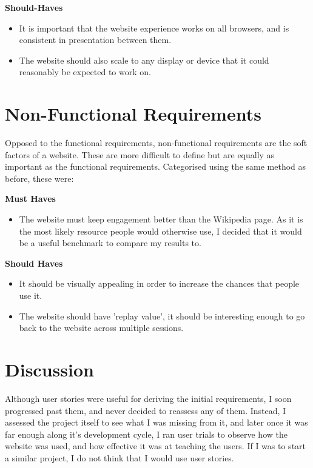 \documentclass{l4proj}
\begin{document}
\textbf{Should-Haves}

\begin{itemize}
    \item It is important that the website experience works on all browsers, and is consistent in presentation between them.
    
    \item The website should also scale to any display or device that it could reasonably be expected to work on.
\end{itemize}

\section{Non-Functional Requirements}

Opposed to the functional requirements, non-functional requirements are the soft factors of a website.  These are more difficult to define but are equally as important as the functional requirements.  Categorised using the same method as before, these were:

\textbf{Must Haves}

\begin{itemize}
    \item The website must keep engagement better than the Wikipedia page.  As it is the most likely resource people would otherwise use, I decided that it would be a useful benchmark to compare my results to.
\end{itemize}


\textbf{Should Haves}

\begin{itemize}
    \item It should be visually appealing in order to increase the chances that people use it.
    \item The website should have 'replay value', it should be interesting enough to go back to the website across multiple sessions.
\end{itemize}

\section{Discussion}

Although user stories were useful for deriving the initial requirements, I soon progressed past them, and never decided to reassess any of them.  Instead, I assessed the project itself to see what I was missing from it, and later once it was far enough along it's development cycle, I ran user trials to observe how the website was used, and how effective it was at teaching the users.  If I was to start a similar project, I do not think that I would use user stories.
\end{document}
